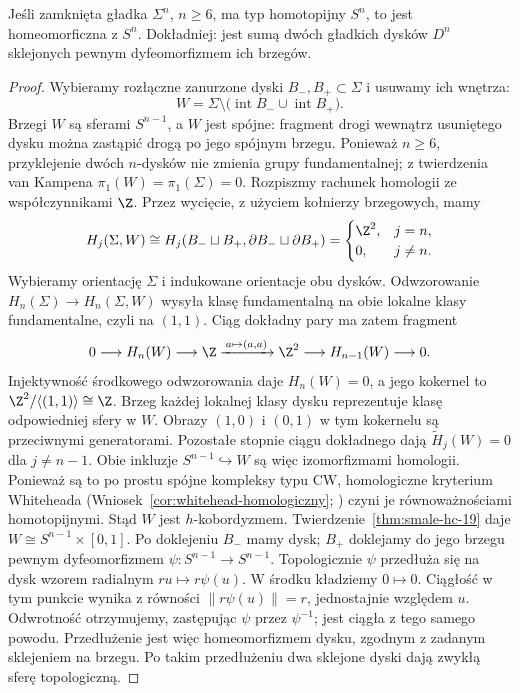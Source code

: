 \begin{wniosek}
\label{wn:homotopijna-sfera-19}
Jeśli zamknięta gładka
$\Sigma^n$, $n\geq6$,
ma typ homotopijny
$S^n$, to jest
homeomorficzna z $S^n$.
Dokładniej: jest sumą
dwóch gładkich dysków
$D^n$ sklejonych
pewnym dyfeomorfizmem
ich brzegów.
\end{wniosek}
\begin{proof}
Wybieramy rozłączne
zanurzone dyski
$B_-,B_+\subset\Sigma$
i usuwamy ich wnętrza:
\[
 W=\Sigma\setminus
   \bigl(\operatorname{int}B_-
          \cup\operatorname{int}B_+\bigr).
\]
Brzegi $W$ są sferami $S^{n-1}$, a $W$ jest spójne:
fragment drogi wewnątrz usuniętego dysku można zastąpić drogą
po jego spójnym brzegu.
Ponieważ $n\geq6$,
przyklejenie dwóch
$n$-dysków nie zmienia
grupy fundamentalnej;
z twierdzenia van Kampena
$\pi_1(W)=\pi_1(\Sigma)=0$.
Rozpiszmy rachunek homologii ze współczynnikami $\Z$.
Przez wycięcie, z użyciem kołnierzy brzegowych, mamy
\[
 H_j(\Sigma,W)\cong
 H_j(B_-\sqcup B_+,\partial B_-\sqcup\partial B_+)
 =\begin{cases}\Z^2,&j=n,\\0,&j\ne n.\end{cases}
\]
Wybieramy orientację $\Sigma$ i indukowane orientacje obu dysków.
Odwzorowanie $H_n(\Sigma)\to H_n(\Sigma,W)$ wysyła klasę
fundamentalną na obie lokalne klasy fundamentalne, czyli na $(1,1)$.
Ciąg dokładny pary ma zatem fragment
\[
 0\longrightarrow H_n(W)\longrightarrow\Z
 \xrightarrow{\,a\mapsto(a,a)\,}\Z^2
 \longrightarrow H_{n-1}(W)\longrightarrow0.
\]
Injektywność środkowego odwzorowania daje $H_n(W)=0$, a jego
kokernel to $\Z^2/\langle(1,1)\rangle\cong\Z$.
Brzeg każdej lokalnej klasy dysku reprezentuje klasę odpowiedniej
sfery w $W$. Obrazy $(1,0)$ i $(0,1)$ w tym kokernelu są
przeciwnymi generatorami. Pozostałe stopnie ciągu dokładnego
dają $\widetilde H_j(W)=0$ dla $j\ne n-1$.
Obie inkluzje
$S^{n-1}\hookrightarrow W$
są więc izomorfizmami
homologii. Ponieważ
są to po prostu spójne
kompleksy typu CW,
homologiczne kryterium Whiteheada
(Wniosek~\ref{cor:whitehead-homologiczny}; )
czyni je równoważnościami
homotopijnymi.
Stąd $W$ jest
$h$-kobordyzmem.
Twierdzenie~\ref{thm:smale-hc-19}
daje $W\cong S^{n-1}\times[0,1]$.
Po doklejeniu $B_-$ mamy
dysk; $B_+$ doklejamy
do jego brzegu pewnym
dyfeomorfizmem
$\psi:S^{n-1}\to S^{n-1}$.
Topologicznie $\psi$
przedłuża się na dysk
wzorem radialnym
$r u\mapsto r\psi(u)$.
W środku kładziemy $0\mapsto0$.
Ciągłość w tym punkcie wynika z równości
$\lVert r\psi(u)\rVert=r$, jednostajnie względem $u$.
Odwrotność otrzymujemy, zastępując $\psi$ przez $\psi^{-1}$;
jest ciągła z tego samego powodu. Przedłużenie jest więc
homeomorfizmem dysku, zgodnym z zadanym sklejeniem na brzegu.
Po takim przedłużeniu
dwa sklejone dyski
dają zwykłą sferę
topologiczną.
\end{proof}

